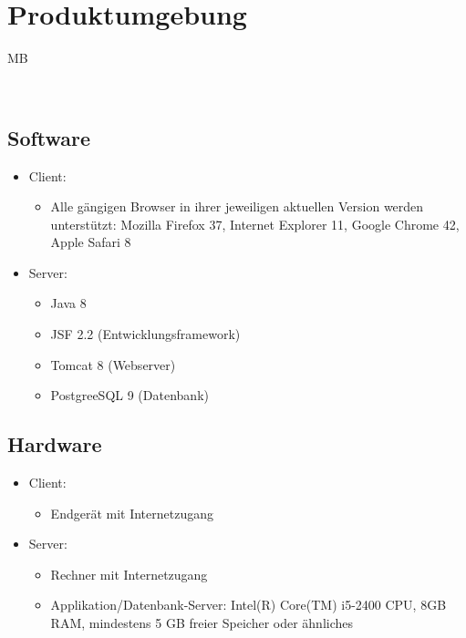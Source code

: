 \documentclass[a4paper]{scrreprt}
\begin{document}
			
 
\chapter{Produktumgebung}
	\begin{tiny}
		MB
	\end{tiny}\\
	
	\section{Software}
        \begin{itemize}
      		\item Client:
	      		\begin{itemize}
	      			\item Alle gängigen Browser in ihrer jeweiligen aktuellen Version  werden unterstützt: Mozilla Firefox 37, Internet Explorer 11, Google Chrome 42, Apple Safari 8
	      		\end{itemize}
          	\item Server:
	            \begin{itemize}
	            	\item Java 8
	            	\item JSF 2.2 (Entwicklungsframework)
	            	\item Tomcat 8 (Webserver)
	            	\item PostgreeSQL 9 (Datenbank)
	            \end{itemize}
        \end{itemize}
        
    \section{Hardware}   
        \begin{itemize}
          	\item Client:
	            \begin{itemize}
	            	\item Endgerät mit Internetzugang
	            \end{itemize}
          	\item Server:
	           \begin{itemize}
		           	\item Rechner mit Internetzugang
		           	\item Applikation/Datenbank-Server: Intel(R) Core(TM) i5-2400 CPU, 8GB
RAM, mindestens 5 GB freier Speicher oder ähnliches
	           \end{itemize}
        \end{itemize}
        
\end{document}

